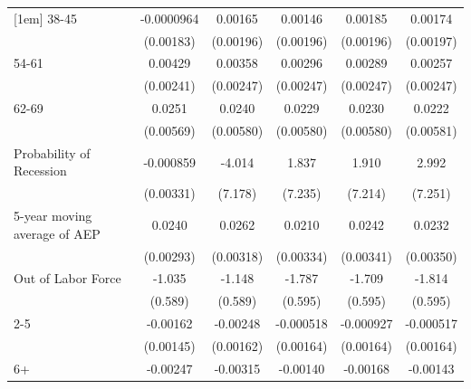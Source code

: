 {\begin{tabular}{l*{5}{c}}
[1em]
38-45               &  -0.0000964         &     0.00165         &     0.00146         &     0.00185         &     0.00174         \\
                    &   (0.00183)         &   (0.00196)         &   (0.00196)         &   (0.00196)         &   (0.00197)         \\
[1em]
54-61               &     0.00429\sym{*}  &     0.00358         &     0.00296         &     0.00289         &     0.00257         \\
                    &   (0.00241)         &   (0.00247)         &   (0.00247)         &   (0.00247)         &   (0.00247)         \\
[1em]
62-69               &      0.0251\sym{***}&      0.0240\sym{***}&      0.0229\sym{***}&      0.0230\sym{***}&      0.0222\sym{***}\\
                    &   (0.00569)         &   (0.00580)         &   (0.00580)         &   (0.00580)         &   (0.00581)         \\
[1em]
Probability of Recession&   -0.000859         &      -4.014         &       1.837         &       1.910         &       2.992         \\
                    &   (0.00331)         &     (7.178)         &     (7.235)         &     (7.214)         &     (7.251)         \\
[1em]
5-year moving average of AEP&      0.0240\sym{***}&      0.0262\sym{***}&      0.0210\sym{***}&      0.0242\sym{***}&      0.0232\sym{***}\\
                    &   (0.00293)         &   (0.00318)         &   (0.00334)         &   (0.00341)         &   (0.00350)         \\
[1em]
Out of Labor Force  &      -1.035\sym{*}  &      -1.148\sym{*}  &      -1.787\sym{***}&      -1.709\sym{***}&      -1.814\sym{***}\\
                    &     (0.589)         &     (0.589)         &     (0.595)         &     (0.595)         &     (0.595)         \\
[1em]
2-5                 &    -0.00162         &    -0.00248         &   -0.000518         &   -0.000927         &   -0.000517         \\
                    &   (0.00145)         &   (0.00162)         &   (0.00164)         &   (0.00164)         &   (0.00164)         \\
[1em]
6+                  &    -0.00247\sym{*}  &    -0.00315\sym{**} &    -0.00140         &    -0.00168         &    -0.00143         \\

\end{tabular}}
